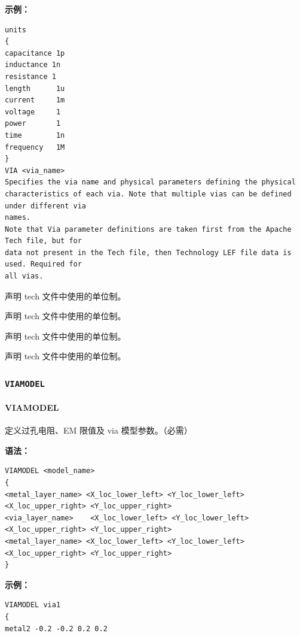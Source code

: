 \textbf{示例：}
\begin{lstlisting}
units
{
capacitance 1p
inductance 1n
resistance 1
length      1u
current     1m
voltage     1
power       1
time        1n
frequency   1M
}
VIA <via_name>
Specifies the via name and physical parameters defining the physical
characteristics of each via. Note that multiple vias can be defined under different via
names.
Note that Via parameter definitions are taken first from the Apache Tech file, but for
data not present in the Tech file, then Technology LEF file data is used. Required for
all vias.
\end{lstlisting}

\begin{noteBox}
声明 tech 文件中使用的单位制。
\end{noteBox}

\begin{noteBox}
声明 tech 文件中使用的单位制。
\end{noteBox}

\begin{noteBox}
声明 tech 文件中使用的单位制。
\end{noteBox}

\begin{noteBox}
声明 tech 文件中使用的单位制。
\end{noteBox}

\subsubsection{\texttt{VIAMODEL}}
\paragraph*{VIAMODEL}

定义过孔电阻、EM 限值及 via 模型参数。（必需）

\textbf{语法：}
\begin{lstlisting}
VIAMODEL <model_name>
{
<metal_layer_name> <X_loc_lower_left> <Y_loc_lower_left>
<X_loc_upper_right> <Y_loc_upper_right>
<via_layer_name>    <X_loc_lower_left> <Y_loc_lower_left>
<X_loc_upper_right> <Y_loc_upper_right>
<metal_layer_name> <X_loc_lower_left> <Y_loc_lower_left>
<X_loc_upper_right> <Y_loc_upper_right>
}
\end{lstlisting}

\textbf{示例：}
\begin{lstlisting}
VIAMODEL via1
{
metal2 -0.2 -0.2 0.2 0.2
\end{lstlisting}

